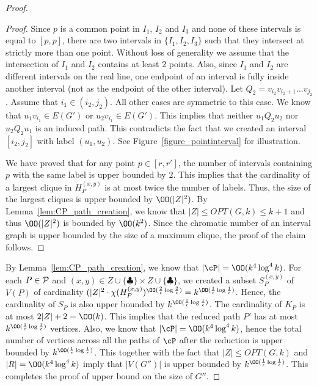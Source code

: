 \begin{proof}
\begin{proof}
Since $p$ is a common point in $I_1$, $I_2$ and $I_3$ and none of these intervals is equal to $[p,p]$, there are two intervals in 
$\{I_1,I_2,I_3\}$ such that they intersect at strictly more than one point. 
Without loss of generality we assume that the intersection of  $I_1$ and $I_2$
contains at least $2$ points. Also, since $I_1$ and $I_2$ are different intervals 
on the real line, one endpoint of an interval is fully inside another interval (not as the endpoint of the other interval). Let $Q_2=v_{i_2}v_{i_2+1}\ldots v_{j_2}$. 
Assume that $i_1\in (i_2,j_2)$. All other cases are symmetric to this case.  
We know that  $u_1v_{i_1}\in E(G')$ or $u_2v_{i_1}\in E(G')$.
This implies that 
neither $u_1Q_2u_2$ nor $u_2Q_2u_1$ is an induced path. This contradicts the fact that we created an interval 
$[i_2,j_2]$ with label $(u_1,u_2)$. See Figure~\ref{figure_pointinterval} for illustration.  


We have proved that for any point $p\in [r,r']$, the number of intervals containing   $p$ with the same label is upper bounded by  $2$. This implies that the cardinality of a largest clique in $H_P^{(x,y)}$ is at most twice the number of labels. Thus, the size of the largest cliques is upper bounded by $\OO(|Z|^2)$. 
By  Lemma~\ref{lem:CP_path_creation}, we know that $\vert Z \vert \leq OPT(G,k) \leq k+1$ and thus 
$\OO(|Z|^2)$ is bounded by $\OO(k^2)$. Since the chromatic number of an interval graph is upper bounded by the size of a maximum clique, the proof of the claim follows.  
\end{proof}




By 
Lemma~\ref{lem:CP_path_creation}, we know that 
$\vert \cP \vert= \OO(k^4\log^4 k)$. 
For each $P\in {\cal P}$ and $(x,y)\in Z\cup \{\clubsuit\} \times Z \cup \{\clubsuit\}$, we created a subset 
$S^{(x,y)}_P$ of $V(P)$ of cardinality $(|Z|^2 \cdot \chi(H_P^{(x,y)}) ^{\OO(\frac{2}{\epsilon}\log \frac{2}{\epsilon})}=k^{\OO(\frac{1}{\epsilon}\log \frac{1}{\epsilon})}$. Hence, the cardinality of $S_P$ is also upper bounded by $k^{\OO(\frac{1}{\epsilon}\log \frac{1}{\epsilon})}$. 
The cardinality of  $K_P$ is 
at most $2|Z|+2=\OO(k)$. 
This implies that the reduced path $P'$ has at most $k^{\OO(\frac{1}{\epsilon}\log \frac{1}{\epsilon})}$ vertices. 
Also, we know that $\vert \cP\vert =\OO(k^4\log^4 k)$, hence the total number of vertices across all the paths of $\cP$ after the reduction is upper bounded by $k^{\OO(\frac{1}{\epsilon}\log \frac{1}{\epsilon})}$. 
This together with the fact that $\vert Z \vert \leq OPT(G,k)$ and  $\vert R\vert = \OO(k^4\log^4 k)$ imply that  $\vert V(G'')\vert$ is upper bounded by $k^{\OO(\frac{1}{\epsilon}\log \frac{1}{\epsilon})}$. This completes the proof of upper bound on the size of $G''$. 



\end{proof}
